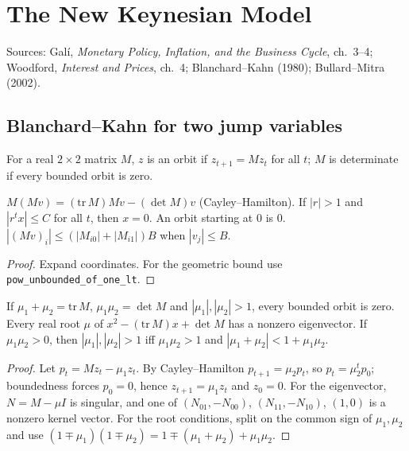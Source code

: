 \chapter{The New Keynesian Model}
\label{chap:nk}

Sources: Galí, \emph{Monetary Policy, Inflation, and the Business Cycle}, ch.~3--4; Woodford, \emph{Interest and
Prices}, ch.~4; Blanchard--Kahn (1980); Bullard--Mitra (2002).

\section{Blanchard--Kahn for two jump variables}
\label{sec:bk}

\begin{definition}
\label{def:bk_determinate}
\leanok
For a real $2\times2$ matrix $M$, $z$ is an orbit if $z_{t+1} = Mz_t$ for all $t$; $M$ is determinate if every
bounded orbit is zero.
\end{definition}

\begin{lemma}
\label{lem:bk_algebra}
\leanok
{}
$M(Mv) = (\mathrm{tr}\,M)Mv - (\det M)v$ (Cayley--Hamilton). If $|r| > 1$ and $|r^tx| \le C$ for all $t$, then
$x = 0$. An orbit starting at $0$ is $0$. $|(Mv)_i| \le (|M_{i0}| + |M_{i1}|)B$ when $|v_j| \le B$.
\end{lemma}
\begin{proof}
\leanok
Expand coordinates. For the geometric bound use \texttt{pow\_unbounded\_of\_one\_lt}.
\end{proof}

\begin{lemma}
\label{lem:bk_real}
\leanok
{}
If $\mu_1 + \mu_2 = \mathrm{tr}\,M$, $\mu_1\mu_2 = \det M$ and $|\mu_1|, |\mu_2| > 1$, every bounded orbit is zero.
Every real root $\mu$ of $x^2 - (\mathrm{tr}\,M)x + \det M$ has a nonzero eigenvector. If $\mu_1\mu_2 > 0$, then
$|\mu_1|, |\mu_2| > 1$ iff $\mu_1\mu_2 > 1$ and $|\mu_1 + \mu_2| < 1 + \mu_1\mu_2$.
\end{lemma}
\begin{proof}
\leanok
Let $p_t = Mz_t - \mu_1z_t$. By Cayley--Hamilton $p_{t+1} = \mu_2p_t$, so $p_t = \mu_2^tp_0$; boundedness forces
$p_0 = 0$, hence $z_{t+1} = \mu_1z_t$ and $z_0 = 0$. For the eigenvector, $N = M - \mu I$ is singular, and one of
$(N_{01}, -N_{00})$, $(N_{11}, -N_{10})$, $(1, 0)$ is a nonzero kernel vector. For the root conditions, split on
the common sign of $\mu_1, \mu_2$ and use $(1 \mp \mu_1)(1 \mp \mu_2) = 1 \mp(\mu_1 + \mu_2) + \mu_1\mu_2$.
\end{proof}

